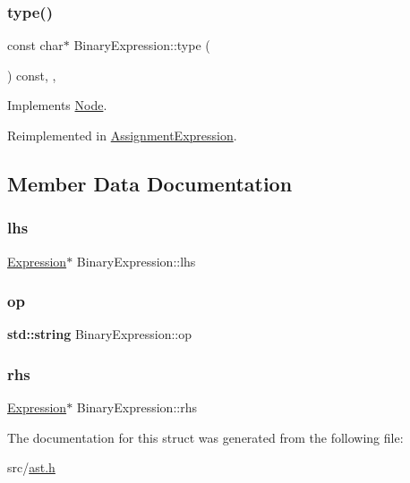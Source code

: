 \subsubsection{\texorpdfstring{type()}{type()}}
{\footnotesize\ttfamily const char$\ast$ Binary\+Expression\+::type (\begin{DoxyParamCaption}{ }\end{DoxyParamCaption}) const\hspace{0.3cm}{\ttfamily [inline]}, {\ttfamily [override]}, {\ttfamily [virtual]}}



Implements \hyperlink{struct_node_a82f29420d0a38efcc370352528e94e9b}{Node}.



Reimplemented in \hyperlink{struct_assignment_expression_a9c5da03eec8d7c10f1127ec5029de263}{Assignment\+Expression}.



\subsection{Member Data Documentation}
\mbox{\label{struct_binary_expression_ae689284a646929c99e634e75f50cb32c}} 
\subsubsection{\texorpdfstring{lhs}{lhs}}
{\footnotesize\ttfamily \hyperlink{struct_expression}{Expression}$\ast$ Binary\+Expression\+::lhs}

\mbox{\label{struct_binary_expression_a4c33b66e2ffc0a5ede2cdd190bf4bd75}} 
\subsubsection{\texorpdfstring{op}{op}}
{\footnotesize\ttfamily \textbf{ std\+::string} Binary\+Expression\+::op}

\mbox{\label{struct_binary_expression_ad569ae3b07f428257b0e7a96746ceb32}} 
\subsubsection{\texorpdfstring{rhs}{rhs}}
{\footnotesize\ttfamily \hyperlink{struct_expression}{Expression}$\ast$ Binary\+Expression\+::rhs}



The documentation for this struct was generated from the following file\+:\begin{DoxyCompactItemize}
\item 
src/\hyperlink{ast_8h}{ast.\+h}\end{DoxyCompactItemize}
